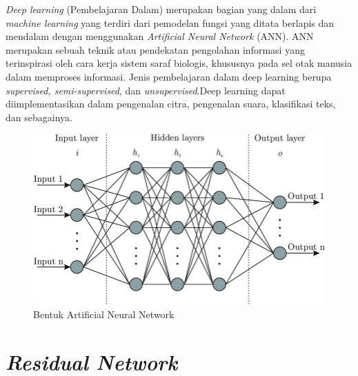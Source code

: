\par \textit{Deep learning} (Pembelajaran Dalam) merupakan bagian yang dalam dari \textit{machine learning} yang terdiri dari pemodelan fungsi yang ditata berlapis dan mendalam dengan menggunakan \textit{Artificial Neural Network} (ANN). ANN merupakan sebuah teknik atau pendekatan pengolahan informasi yang terinspirasi oleh cara kerja sistem saraf biologis, khususnya pada sel otak manusia dalam memproses informasi. Jenis pembelajaran dalam deep learning berupa \textit{supervised, semi-supervised}, dan \textit{unsupervised}.Deep learning dapat diimplementasikan dalam pengenalan citra, pengenalan suara, klasifikasi teks, dan sebagainya. 

\begin{figure}[h!]
\centering
\includegraphics[scale=0.2]{img/Artificial.png}
\caption{Bentuk Artificial Neural Network \cite{cit:18}}
\label{fig:ANN}
\end{figure}

\section{\textit{Residual Network}}
\vspace{1ex}

